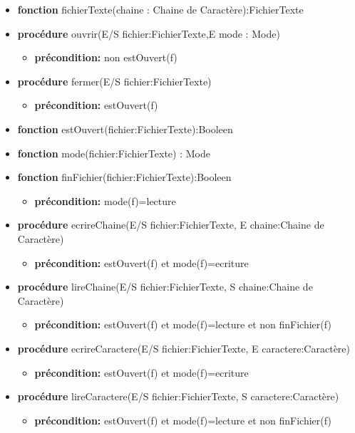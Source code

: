 \documentclass{article}
\begin{document}
	\begin{itemize}[label=$\ $, leftmargin=1cm]
		 \item \textbf{fonction} fichierTexte(chaine : Chaine de Caractère):FichierTexte
		 \item \textbf{procédure} ouvrir(E/S fichier:FichierTexte,E mode : Mode)
		 \begin{itemize}[label=$| $]
            \item \textbf{précondition:} non estOuvert(f)
         \end{itemize}
         \item \textbf{procédure} fermer(E/S fichier:FichierTexte)
		 \begin{itemize}[label=$| $]
            \item \textbf{précondition:} estOuvert(f)
         \end{itemize}
		 \item \textbf{fonction} estOuvert(fichier:FichierTexte):Booleen
		 \item \textbf{fonction} mode(fichier:FichierTexte) : Mode
		 \item \textbf{fonction} finFichier(fichier:FichierTexte):Booleen
		 \begin{itemize}[label=$| $]
            \item \textbf{précondition:} mode(f)=lecture
         \end{itemize}
         \item \textbf{procédure} ecrireChaine(E/S fichier:FichierTexte, E chaine:Chaine de Caractère)
         \begin{itemize}[label=$| $]
            \item \textbf{précondition:} estOuvert(f) et mode(f)=ecriture
         \end{itemize}
         \item \textbf{procédure} lireChaine(E/S fichier:FichierTexte, S chaine:Chaine de Caractère)
         \begin{itemize}[label=$| $]
            \item \textbf{précondition:} estOuvert(f) et mode(f)=lecture et non finFichier(f)
         \end{itemize}
         \item \textbf{procédure} ecrireCaractere(E/S fichier:FichierTexte, E caractere:Caractère)
         \begin{itemize}[label=$| $]
            \item \textbf{précondition:} estOuvert(f) et mode(f)=ecriture
         \end{itemize}
         \item \textbf{procédure} lireCaractere(E/S fichier:FichierTexte, S caractere:Caractère)
         \begin{itemize}[label=$| $]
            \item \textbf{précondition:} estOuvert(f) et mode(f)=lecture et non finFichier(f)
         \end{itemize}

	\end{itemize} 
    
\end{document}

